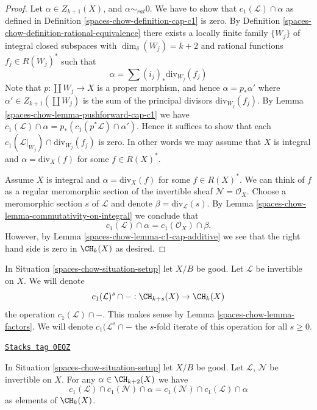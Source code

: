 \begin{proof}
Let $\alpha \in Z_{k + 1}(X)$, and $\alpha \sim_{rat} 0$.
We have to show that $c_1(\mathcal{L}) \cap \alpha$
as defined in Definition \ref{spaces-chow-definition-cap-c1} is zero.
By Definition \ref{spaces-chow-definition-rational-equivalence} there
exists a locally finite family $\{W_j\}$ of integral closed
subspaces with $\dim_\delta(W_j) = k + 2$ and rational functions
$f_j \in R(W_j)^*$ such that
$$
\alpha = \sum (i_j)_*\text{div}_{W_j}(f_j)
$$
Note that $p : \coprod W_j \to X$ is a proper morphism,
and hence $\alpha = p_*\alpha'$ where $\alpha' \in Z_{k + 1}(\coprod W_j)$
is the sum of the principal divisors $\text{div}_{W_j}(f_j)$.
By Lemma \ref{spaces-chow-lemma-pushforward-cap-c1} we have
$c_1(\mathcal{L}) \cap \alpha = p_*(c_1(p^*\mathcal{L}) \cap \alpha')$.
Hence it suffices to show that each
$c_1(\mathcal{L}|_{W_j}) \cap \text{div}_{W_j}(f_j)$ is zero.
In other words we may assume that $X$ is integral and
$\alpha = \text{div}_X(f)$ for some $f \in R(X)^*$.

\medskip\noindent
Assume $X$ is integral and $\alpha = \text{div}_X(f)$ for some $f \in R(X)^*$.
We can think of $f$ as a regular meromorphic section of the invertible
sheaf $\mathcal{N} = \mathcal{O}_X$. Choose a meromorphic section
$s$ of $\mathcal{L}$ and denote $\beta = \text{div}_\mathcal{L}(s)$.
By Lemma \ref{spaces-chow-lemma-commutativity-on-integral}
we conclude that
$$
c_1(\mathcal{L}) \cap \alpha = c_1(\mathcal{O}_X) \cap \beta.
$$
However, by Lemma \ref{spaces-chow-lemma-c1-cap-additive} we see that the right hand side
is zero in $\CH_k(X)$ as desired.
\end{proof}

In Situation \ref{spaces-chow-situation-setup} let $X/B$ be good.
Let $\mathcal{L}$ be invertible on $X$.
We will denote
$$
c_1(\mathcal{L})^s \cap - : \CH_{k + s}(X) \to \CH_k(X)
$$
the operation $c_1(\mathcal{L}) \cap - $. This makes sense by
Lemma \ref{spaces-chow-lemma-factors}. We will denote $c_1(\mathcal{L}^s \cap -$
the $s$-fold iterate of this operation for all $s \geq 0$.

\begin{lemma}
\label{spaces-chow-lemma-cap-commutative}
\href{https://stacks.math.columbia.edu/tag/0EQZ}{\texttt{Stacks tag 0EQZ}}

In Situation \ref{spaces-chow-situation-setup} let $X/B$ be good.
Let $\mathcal{L}$, $\mathcal{N}$ be invertible on $X$.
For any $\alpha \in \CH_{k + 2}(X)$ we have
$$
c_1(\mathcal{L}) \cap c_1(\mathcal{N}) \cap \alpha
=
c_1(\mathcal{N}) \cap c_1(\mathcal{L}) \cap \alpha
$$
as elements of $\CH_k(X)$.
\end{lemma}

